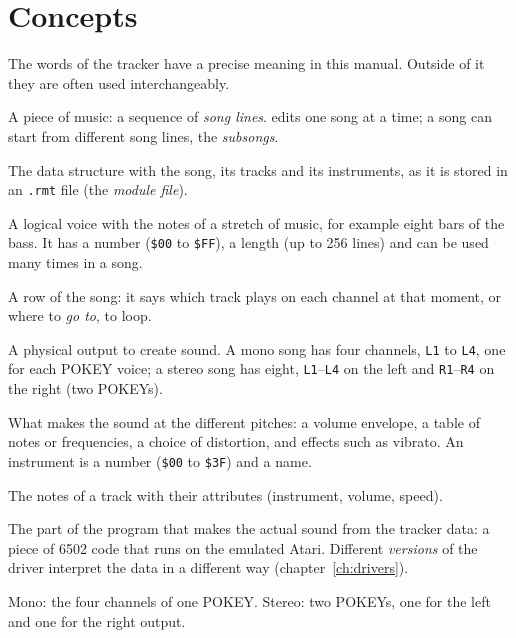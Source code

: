 \chapter{Concepts}\label{ch:concepts}

The words of the tracker have a precise meaning in this manual. Outside of it they are often used interchangeably.

\begin{description}[style=nextline,leftmargin=1.2cm]
  \item[Song] A piece of music: a sequence of \emph{song lines}. \RITMO{} edits one song at a time; a song can start from
        different song lines, the \emph{subsongs}.
  \item[Module] The data structure with the song, its tracks and its instruments, as it is stored in an \texttt{.rmt} file
        (the \emph{module file}).
  \item[Track] A logical voice with the notes of a stretch of music, for example eight bars of the bass. It has a number
        (\texttt{\$00} to \texttt{\$FF}), a length (up to 256 lines) and can be used many times in a song.
  \item[Song line] A row of the song: it says which track plays on each channel at that moment, or where to
        \emph{go to}, to loop.
  \item[Channel] A physical output to create sound. A mono song has four channels, \texttt{L1} to \texttt{L4}, one for each
        POKEY voice; a stereo song has eight, \texttt{L1}--\texttt{L4} on the left and \texttt{R1}--\texttt{R4} on the right (two POKEYs).
  \item[Instrument] What makes the sound at the different pitches: a volume envelope, a table of notes or frequencies, a choice of
        distortion, and effects such as vibrato. An instrument is a number (\texttt{\$00} to \texttt{\$3F}) and a name.
  \item[Pattern] The notes of a track with their attributes (instrument, volume, speed).
  \item[Tracker driver] The part of the program that makes the actual sound from the tracker data: a piece of 6502 code that
        runs on the emulated Atari. Different \emph{versions} of the driver interpret the data in a different way
        (chapter~\ref{ch:drivers}).
  \item[Mono / stereo] Mono: the four channels of one POKEY. Stereo: two POKEYs, one for the left and one for the right output.
\end{description}

